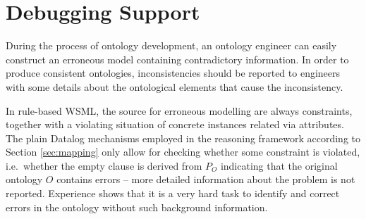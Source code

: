 \def\transdebug{\transtxt{debug}}
\def\pvotype{\predicate{\predsubtxt{v\_otype}}}
\def\pvmincard{\predicate{\predsubtxt{v\_mincard}}}
\def\pvmaxcard{\predicate{\predsubtxt{v\_maxcard}}}
\def\pvuser{\predicate{\predsubtxt{v\_user}}}
\def\axiomid{\ensuremath{Ax_{I\!D}}\xspace}
\def\debugaxioms{\ensuremath{P_{\smtxtit{debug}}}\xspace}

\section{Debugging Support\label{sec:debugging}}

During the process of ontology development, an ontology engineer
can easily construct an erroneous model containing contradictory
information. In order to produce consistent ontologies,
inconsistencies should be reported to engineers with some details
about the ontological elements that cause the inconsistency.

In rule-based WSML, the source for erroneous modelling are always
constraints, together with a violating situation of concrete
instances related via attributes. The plain Datalog mechanisms
employed in the reasoning framework according to Section
\ref{sec:mapping} only allow for checking whether some constraint
is violated, i.e.\ whether the empty clause is derived from $P_O$
indicating that the original ontology $O$ contains errors -- more
detailed information about the problem is not reported. Experience
shows that it is a very hard task to identify and correct errors
in the ontology without such background information.


